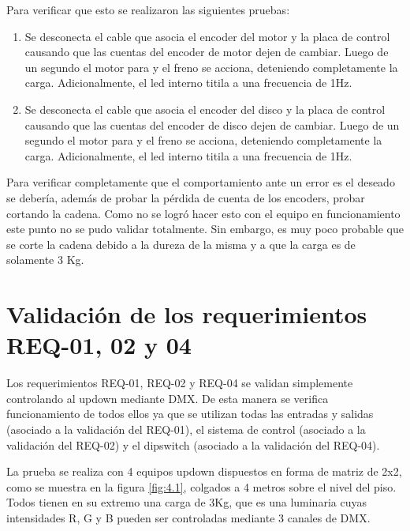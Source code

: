 Para verificar que esto se realizaron las siguientes pruebas:
\begin{enumerate}
	\item Se desconecta el cable que asocia el encoder del motor y la placa de control causando que las cuentas del encoder de motor dejen de cambiar. Luego de un segundo el motor para y el freno se acciona, deteniendo completamente la carga. Adicionalmente, el led interno titila a una frecuencia de 1Hz.
	\item Se desconecta el cable que asocia el encoder del disco y la placa de control  causando que las cuentas del encoder de disco dejen de cambiar. Luego de un segundo el motor para y el freno se acciona, deteniendo completamente la carga. Adicionalmente, el led interno titila a una frecuencia de 1Hz.
\end{enumerate}
Para verificar completamente que el comportamiento ante un error es el deseado se debería, además de probar la pérdida de cuenta de los encoders, probar cortando la cadena. Como no se logró hacer esto con el equipo en funcionamiento este punto no se pudo validar totalmente. Sin embargo, es muy poco probable que se corte la cadena debido a la dureza de la misma y a que la carga es de solamente 3 Kg.

\section{Validación de los requerimientos REQ-01, 02 y 04} \label{sec:\thesection}
Los requerimientos REQ-01, REQ-02 y REQ-04 se validan simplemente controlando al updown mediante DMX. De esta manera se verifica funcionamiento de todos ellos ya que se utilizan todas las entradas y salidas (asociado a la validación del REQ-01), el sistema de control (asociado a la validación del REQ-02) y el dipswitch (asociado a la validación del REQ-04).

La prueba se realiza con 4 equipos updown dispuestos en forma de matriz de 2x2, como se muestra en la figura \ref{fig:4.1}, colgados a 4 metros sobre el nivel del piso. Todos tienen en su extremo una carga de 3Kg, que es una luminaria cuyas intensidades R, G y B pueden ser controladas mediante 3 canales de DMX.

